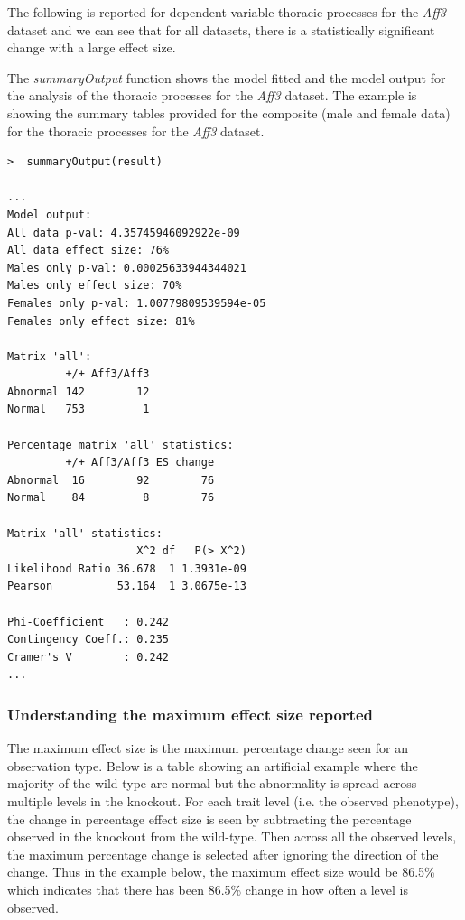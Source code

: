 \documentclass[12pt,a4paper]{article}
\begin{document}
The following is reported for dependent variable thoracic processes for the \textit{Aff3} dataset and we can see that for all datasets, there is a statistically significant change with a large effect size. 

The \textit{summaryOutput} function shows the model fitted and the model output for the analysis of the thoracic processes for the \textit{Aff3} dataset. 
The example is showing the summary tables provided for the composite (male and female data) for the thoracic processes for the \textit{Aff3} dataset. 

\begingroup
    \fontsize{8pt}{12pt}\selectfont
\begin{verbatim}
>  summaryOutput(result)

...
Model output:
All data p-val: 4.35745946092922e-09
All data effect size: 76%
Males only p-val: 0.00025633944344021
Males only effect size: 70%
Females only p-val: 1.00779809539594e-05
Females only effect size: 81%

Matrix 'all':
         +/+ Aff3/Aff3
Abnormal 142        12
Normal   753         1

Percentage matrix 'all' statistics:
         +/+ Aff3/Aff3 ES change
Abnormal  16        92        76
Normal    84         8        76

Matrix 'all' statistics:
                    X^2 df   P(> X^2)
Likelihood Ratio 36.678  1 1.3931e-09
Pearson          53.164  1 3.0675e-13

Phi-Coefficient   : 0.242 
Contingency Coeff.: 0.235 
Cramer's V        : 0.242 
...

\end{verbatim}
\endgroup 


\subsubsection{Understanding the maximum effect size reported}
\label{FE_EffectSize}
The maximum effect size is the maximum percentage change seen for an observation type. 
Below is a table showing an artificial example where the majority of the wild-type are normal but the abnormality is spread across multiple levels in the knockout. 
For each trait level (i.e. the observed phenotype), the change in percentage effect size is seen by subtracting the percentage observed in the knockout from the wild-type. 
Then across all the observed levels, the maximum percentage change is selected after ignoring the direction of the change. 
Thus in the example below, the maximum effect size would be 86.5\% which indicates that there has been 86.5\% change in how often a level is observed.
\end{document}
